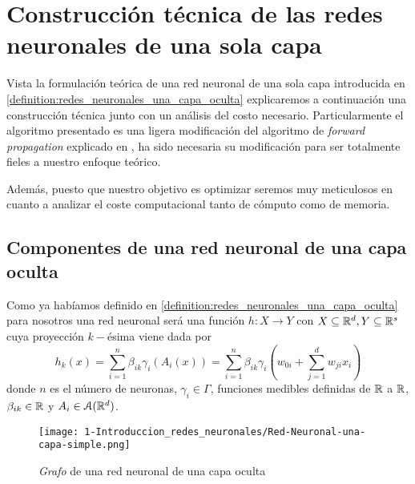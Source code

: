 %

\chapter{Construcción técnica de las redes neuronales de una sola capa}  
\label{chapter:construir-redes-neuronales}
Vista la formulación teórica de una red neuronal de una sola capa 
introducida en \ref{definition:redes_neuronales_una_capa_oculta} explicaremos a continuación  una construcción técnica junto con un
análisis del costo necesario.
 Particularmente el algoritmo presentado es una ligera modificación del algoritmo de    
\textit{forward propagation} explicado en \cite{BishopPaterRecognition}, ha sido necesaria su modificación para ser totalmente fieles a nuestro enfoque teórico. 

Además, puesto que nuestro objetivo es optimizar seremos muy meticulosos en cuanto a analizar el coste computacional tanto de cómputo como de memoria.

\section{Componentes de una red neuronal de una capa oculta} 

Como ya habíamos definido en \ref{definition:redes_neuronales_una_capa_oculta}  
para nosotros una red neuronal será  una función $h : X \longrightarrow Y$ con $X \subseteq \mathbb{R}^d, Y \subseteq \mathbb{R}^s$ 
cuya proyección $k-$ésima viene dada por
\begin{equation}
    h_k(x) =  \sum_{i=1}^{n} \beta_{i k} \gamma_{i}( A_{i}(x))
    = 
    \sum_{i=1}^{n} \beta_{i k} \gamma_{i}
    \left(
        w_{0 i} + \sum_{j=1}^d w_{j i } x_i
    \right) 
\end{equation}
donde $n$ es el número de neuronas,   $\gamma_{i} \in \Gamma$, funciones medibles definidas de $\mathbb{R}$ a $\mathbb{R}$,
$\beta_{i k} \in \mathbb{R}$ y $A_i \in \mathcal{A}(\mathbb{R}^d)$.

\begin{figure}[h!]
    \centering
    \texttt{[image: 1-Introduccion\_redes\_neuronales/Red-Neuronal-una-capa-simple.png]}
    \caption{\textit{Grafo} de una red neuronal de una capa oculta}
    \label{img:grafo-red-neuronal-una-capa-oculta_repeticion}
\end{figure}


